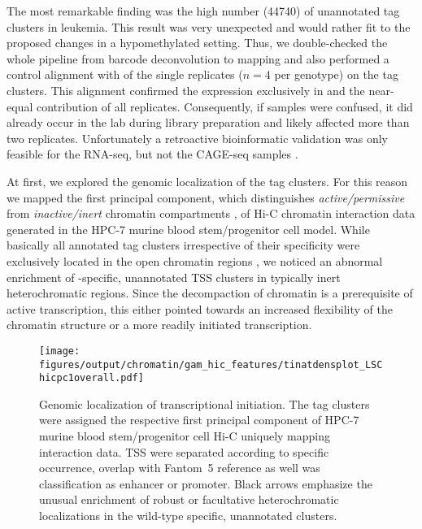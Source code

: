 The most remarkable finding was the high number (\num{44740}) of unannotated tag clusters in \dnmtwt \mllafnine leukemia. This result was very unexpected and would rather fit to the proposed changes in a hypomethylated setting. Thus, we double-checked the whole pipeline from barcode deconvolution to mapping and also performed a control alignment with \cite{Bushnell2014} of the single replicates (\ensuremath{n=4} per genotype) on the tag clusters. This alignment confirmed the expression exclusively in \dnmtwt and the near-equal contribution of all replicates. Consequently, if samples were confused, it did already occur in the lab during library preparation and likely affected more than two replicates. Unfortunately a retroactive bioinformatic validation was only feasible for the RNA-seq, but not the CAGE-seq samples .

At first, we explored the genomic localization of the tag clusters. For this reason we mapped the first principal component, which distinguishes \emph{active/permissive} from \emph{inactive/inert} chromatin compartments\cite{Lieberman-Aiden2009} , of Hi-C chromatin interaction data generated in the HPC-7 murine blood stem/progenitor cell model\cite{Wilson2016}. While basically all annotated tag clusters irrespective of their specificity were exclusively located in the open chromatin regions , we noticed an abnormal enrichment of \dnmtwt-specific, unannotated TSS clusters in typically inert heterochromatic regions. Since the decompaction of chromatin is a prerequisite of active transcription, this either pointed towards an increased flexibility of the chromatin structure or a more readily initiated transcription. 

\begin{figure}[!ht]
	\centering
	\texttt{[image: figures/output/chromatin/gam\_hic\_features/tinatdensplot\_LSChicpc1overall.pdf]} 
	\caption{Genomic localization of transcriptional initiation. The tag clusters were assigned the respective first principal component of HPC-7 murine blood stem/progenitor cell Hi-C uniquely mapping interaction data. TSS were separated according to specific occurrence, overlap with Fantom~5 reference as well was classification as enhancer or promoter. Black arrows emphasize the unusual enrichment of robust or facultative heterochromatic localizations in the wild-type specific, unannotated clusters.}
	\label{fig:tinatdensplot_LSChicpc1overall.pdf}
\end{figure}

